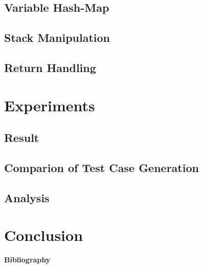 \documentclass[12pt,oneside]{book}
\begin{document}
\section{Variable Hash-Map}
\section{Stack Manipulation}
\section{Return Handling}

\chapter{Experiments}
\section{Result}
\section{Comparion of Test Case Generation}
\section{Analysis}

\chapter{Conclusion}
\newpage

\begin{center}
\textbf{\Large{Bibliography}}
\end{center}
\end{document}
